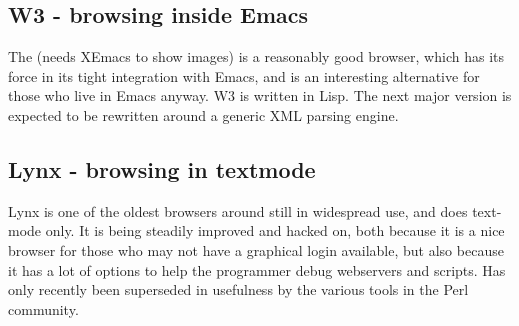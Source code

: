 \subsection{W3 - browsing inside Emacs}
\label{sec:w3-browsing-inside-emacs}

The  (needs XEmacs to show images) is a reasonably good browser,
which has its force in its tight integration with Emacs, and is an
interesting alternative for those who live in Emacs anyway.  W3 is
written in Lisp.  The next major version is expected to be rewritten
around a generic XML parsing engine.


\subsection{Lynx - browsing in textmode}
\label{sec:lynx-browsing-in-textmode}

Lynx is one of the oldest browsers around still in widespread use, and
does text-mode only.  It is being steadily improved and hacked on,
both because it is a nice browser for those who may not have a
graphical login available, but also because it has a lot of options to
help the programmer debug webservers and scripts.  Has only recently
been superseded in usefulness by the various tools in the Perl
community.















